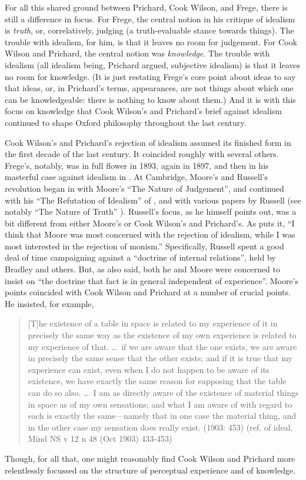 For all this shared ground between Prichard, Cook Wilson, and Frege, there is still a difference in focus. For Frege, the central notion in his critique of idealism is \emph{truth}, or, correlatively, judging (a truth-evaluable stance towards things). The trouble with idealism, for him, is that it leaves no room for judgement. For Cook Wilson and Prichard, the central notion was \emph{knowledge}. The trouble with idealism (all idealism being, Prichard argued, subjective idealism) is that it leaves no room for knowledge. (It is just restating Frege's core point about ideas to say that ideas, or, in Prichard’s terms, appearances, are not things about which one can be knowledgeable: there is nothing to know about them.) And it is with this focus on knowledge that Cook Wilson’s and Prichard’s brief against idealism continued to shape Oxford philosophy throughout the last century.

Cook Wilson’s and Prichard’s rejection of idealism assumed its finished form in the first decade of the last century. It coincided roughly with several others. Frege's, notably, was in full flower in 1893, again in 1897, and then in his masterful case against idealism in \citeyear{Frege:1918lq}. At Cambridge, Moore’s and Russell's revolution began in \citeyear{Moore:1899sd} with Moore’s ``The Nature of Judgement'', and continued with his ``The Refutation of Idealism'' of \citeyear{Moore:1903uo}, and with various papers by Russell (see notably ``The Nature of Truth'' \citeyear{Russell:1906sm}). Russell's focus, as he himself points out, was a bit different from either Moore's or Cook Wilson's and Prichard's. As \citet[42]{Russell:1959fv} puts it, ``I think that Moore was most concerned with the rejection of idealism, while I was most interested in the rejection of monism.'' Specifically, Russell spent a good deal of time campaigning against a ``doctrine of internal relations'', held by Bradley and others. But, as \citet[42]{Russell:1959fv} also said, both he and Moore were concerned to insist on ``the doctrine that fact is in general independent of experience''. Moore's points coincided with Cook Wilson and Prichard at a number of crucial points. He insisted, for example, 
\begin{quote}
	[T]he existence of a table in space is related to my experience of it in precisely the same way as the existence of my own experience is related to my experience of that. \ldots\ if we are aware that the one exists, we are aware in precisely the same sense that the other exists; and if it is true that my experience can exist, even when I do not happen to be aware of its existence, we have exactly the same reason for supposing that the table can do so also. \ldots\ I am as directly aware of the existence of material things in space as of my own sensations; and what I am aware of with regard to each is exactly the same---namely that in one case the material thing, and in the other case my sensation does really exist. (1903: 453) (ref. of ideal. Mind NS v 12 n 48 (Oct 1903) 433-453)
\end{quote}
Though, for all that, one might reasonably find Cook Wilson and Prichard more relentlessly focussed on the structure of perceptual experience and of knowledge.

